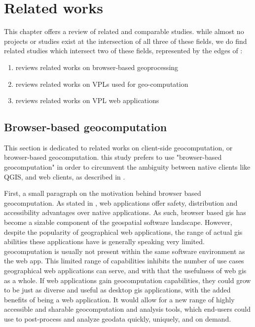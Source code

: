 \chapter{Related works}
\label{chap:related}

This chapter offers a review of related and comparable studies.
while almost no projects or studies exist at the intersection of all three of these fields, we do find related studies which intersect two of these fields, represented by the edges of :
\begin{enumerate}[-]
  \item {} reviews related works on browser-based geoprocessing
  \item {} reviews related works on VPLs used for geo-computation
  \item {} reviews related works on VPL web applications
\end{enumerate}

\section{Browser-based geocomputation}
\label{sec:related-geoweb}

This section is dedicated to related works on client-side geocomputation, or browser-based geocomputation. 
this study prefers to use "browser-based geocomputation" in order to circumvent the ambiguity between native clients like QGIS, and web clients, as described in .

First, a small paragraph on the motivation behind browser based geocomputation.
As stated in , web applications offer safety, distribution and accessibility advantages over native applications.
As such, browser based gis has become a sizable component of the geospatial software landscape. 
However, despite the popularity of geographical web applications, the range of actual \ac{gis} abilities these applications have is generally speaking very limited. \ac{geocomputation} is usually not present within the same software environment as the web app. 
This limited range of capabilities inhibits the number of use cases geographical web applications can serve, and with that the usefulness of web \ac{gis} as a whole.
If web applications gain \ac{geocomputation} capabilities, they could grow to be just as diverse and useful as desktop \ac{gis} applications, with the added benefits of being a web application. It would allow for a new range of highly accessible and sharable geocomputation and analysis tools, which end-users could use to post-process and analyze geodata quickly, uniquely, and on demand.

